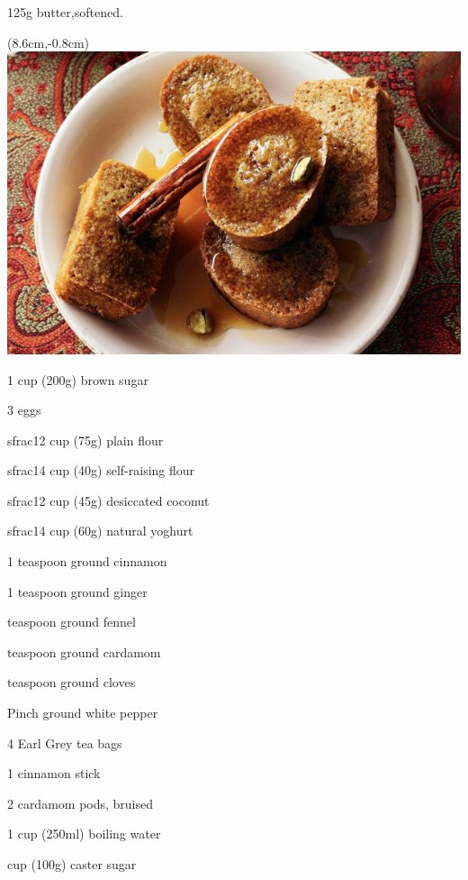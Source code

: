 \begin{ingredients-list}
	\item 125g butter,softened.
		\begin{textblock*}{8cm}(8.6cm,-0.8cm) %
			\includegraphics[scale=0.35]{./img/chai-spiced_cakes.jpg}
		\end{textblock*}
	\item 1 cup (200g) brown sugar
	\item 3 eggs
	\item sfrac{1}{2} cup (75g) plain flour
	\item sfrac{1}{4} cup (40g) self-raising flour
	\item sfrac{1}{2} cup (45g) desiccated coconut
	\item sfrac{1}{4} cup (60g) natural yoghurt
	\item 1 teaspoon ground cinnamon
	\item 1 teaspoon ground ginger
	\item {} teaspoon ground fennel
	\item {} teaspoon ground cardamom
	\item {} teaspoon ground cloves
	\item Pinch ground white pepper
	\item 4 Earl Grey tea bags
	\item 1 cinnamon stick
	\item 2 cardamom pods, bruised
	\item 1 cup (250ml) boiling water
	\item {} cup (100g) caster sugar 
\end{ingredients-list}

